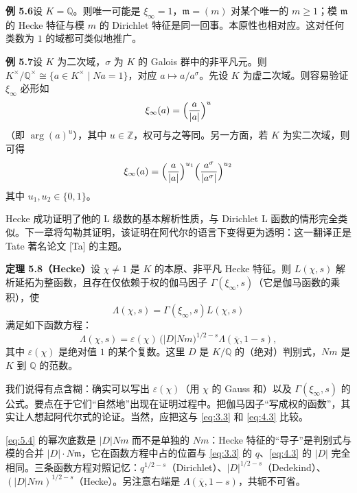 \par\medskip\noindent\textbf{例 5.6}\quad 设 $K=\mathbb{Q}$。则唯一可能是 $\xi_{\infty}=1$，$\mathfrak{m}=(m)$ 对某个唯一的 $m\ge 1$；模 $\mathfrak{m}$ 的 Hecke 特征与模 $m$ 的 Dirichlet 特征是同一回事。本原性也相对应。这对任何类数为 $1$ 的域都可类似地推广。

\par\medskip\noindent\textbf{例 5.7}\quad 设 $K$ 为二次域，$\sigma$ 为 $K$ 的 Galois 群中的非平凡元。则 $K^{\times}/\mathbb{Q}^{\times}\cong\{a\in K^{\times}\mid Na=1\}$，对应 $a\mapsto a/a^{\sigma}$。先设 $K$ 为虚二次域。则容易验证 $\xi_{\infty}$ 必形如
\[
\xi_{\infty}(a)=\Bigl(\frac{a}{|a|}\Bigr)^{u}
\]
（即 $\arg(a)^{u}$），其中 $u\in\mathbb{Z}$，权可与之等同。另一方面，若 $K$ 为实二次域，则可得
\[
\xi_{\infty}(a)=\Bigl(\frac{a}{|a|}\Bigr)^{u_1}
\Bigl(\frac{a^{\sigma}}{|a^{\sigma}|}\Bigr)^{u_2}
\]
其中 $u_1,u_2\in\{0,1\}$。

Hecke 成功证明了他的 L 级数的基本解析性质，与 Dirichlet L 函数的情形完全类似。下一章将勾勒其证明，该证明在阿代尔的语言下变得更为透明：这一翻译正是 Tate 著名论文 [Ta] 的主题。

\par\medskip\noindent\textbf{定理 5.8（Hecke）}\quad 设 $\chi\neq 1$ 是 $K$ 的本原、非平凡 Hecke 特征。则 $L(\chi,s)$ 解析延拓为整函数，且存在仅依赖于权的伽马因子 $\Gamma(\xi_{\infty},s)$（它是伽马函数的乘积），使
\[
\Lambda(\chi,s)=\Gamma(\xi_{\infty},s)L(\chi,s)
\]
满足如下函数方程：
\begin{equation}\tag{5.4}\label{eq:5.4}
\Lambda(\chi,s)=\varepsilon(\chi)\,\bigl(|D|Nm\bigr)^{1/2-s}
\Lambda(\overline{\chi},1-s),
\end{equation}
其中 $\varepsilon(\chi)$ 是绝对值 $1$ 的某个复数。这里 $D$ 是 $K/\mathbb{Q}$ 的（绝对）判别式，$Nm$ 是 $K$ 到 $\mathbb{Q}$ 的范数。

我们说得有点含糊：确实可以写出 $\varepsilon(\chi)$（用 $\chi$ 的 Gauss 和）以及 $\Gamma(\xi_{\infty},s)$ 的公式。要点在于它们“自然地”出现在证明过程中。把伽马因子“写成权的函数”，其实让人想起阿代尔式的论证。当然，应把这与 \eqref{eq:3.3} 和 \eqref{eq:4.3} 比较。

\begin{annote}
\eqref{eq:5.4} 的幂次底数是 $|D|Nm$ 而不是单独的 $Nm$：Hecke 特征的“导子”是判别式与模的合并 $|D|\cdot N\mathfrak{m}$，它在函数方程中占的位置与 \eqref{eq:3.3} 的 $q$、\eqref{eq:4.3} 的 $|D|$ 完全相同。三条函数方程对照记忆：$q^{1/2-s}$（Dirichlet）、$|D|^{1/2-s}$（Dedekind）、$(|D|Nm)^{1/2-s}$（Hecke）。另注意右端是 $\Lambda(\overline{\chi},1-s)$，共轭不可省。
\par\vspace{0.15em}{\raggedleft 【来源：Tate 论文（Cassels--Fröhlich 编《Algebraic Number Theory》）（A）；Neukirch《Algebraic Number Theory》Ch.~VII（A）】\par}
\end{annote}

